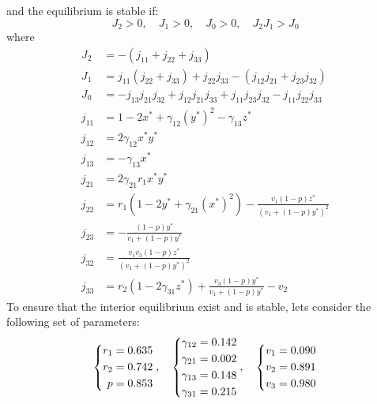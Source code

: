 and the equilibrium is stable if:
\[
J_2>0,\quad J_1>0,\quad J_0>0,\quad J_2J_1>J_0
\]
where
\begin{align*}
    J_2 &= -\left(j_{11}+j_{22}+j_{33}\right)\\
    J_1 &= j_{11}\left(j_{22}+j_{33}\right)+j_{22}j_{33}-\left(j_{12}j_{21}+j_{23}j_{32}\right)\\
    J_0 &= -j_{13}j_{21}j_{32}+j_{12}j_{21}j_{33}+j_{11}j_{23}j_{32}-j_{11}j_{22}j_{33}\\
    j_{11} &= 1-2x^*+\gamma_{12}\left(y^*\right)^2-\gamma_{13}z^*\\
    j_{12} &= 2\gamma_{12}x^*y^*\\
    j_{13} &= -\gamma_{13}x^*\\
    j_{21} &= 2\gamma_{21}r_1x^*y^*\\
    j_{22} &= r_1\left(1-2y^*+\gamma_{21}\left(x^*\right)^2\right)-\frac{v_1\left(1-p\right)z^*}{\left(v_1+\left(1-p\right)y^*\right)^2}\\
    j_{23} &= -\frac{\left(1-p\right)y^*}{v_1+\left(1-p\right)y^*}\\
    j_{32} &= \frac{v_1v_3\left(1-p\right)z^*}{\left(v_1+\left(1-p\right)y^*\right)^2}\\
    j_{33} &= r_2\left(1-2\gamma_{31}z^*\right)+\frac{v_3\left(1-p\right)y^*}{v_1+\left(1-p\right)y^*}-v_2
\end{align*}
To ensure that the interior equilibrium exist and is stable, lets consider the following set of parameters:
\begin{equation}
    \begin{dcases}
        \begin{aligned}
            r_1 &= 0.635\\
            r_2 &= 0.742\\
            p &= 0.853
        \end{aligned}
    \end{dcases},\quad 
    \begin{dcases}
        \begin{aligned}
            \gamma_{12} &= 0.142\\
            \gamma_{21} &= 0.002\\
            \gamma_{13} &= 0.148\\
            \gamma_{31} &= 0.215
        \end{aligned}
    \end{dcases},\quad
    \begin{dcases}
        \begin{aligned}
            v_1 &= 0.090\\
            v_2 &= 0.891\\
            v_3 &= 0.980
        \end{aligned}
    \end{dcases} 
    \label{params:6.5}
\end{equation}
